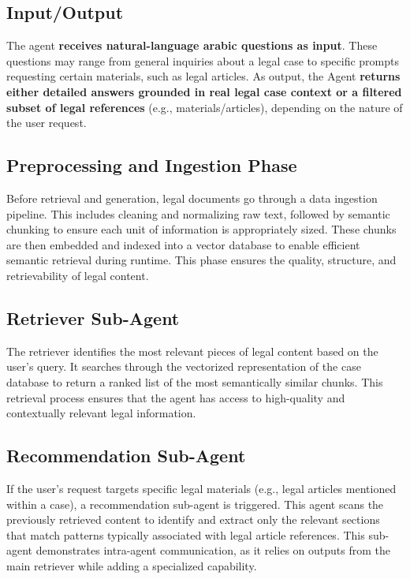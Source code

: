 \subsection{Input/Output}

The agent \textbf{receives natural-language arabic questions as input}. These questions may range from general inquiries about a legal case to specific prompts requesting certain materials, such as legal articles. As output, the Agent\textbf{ returns either detailed answers grounded in real legal case context or a filtered subset of legal references} (e.g., materials/articles), depending on the nature of the user request.

\subsection{Preprocessing and Ingestion Phase}
Before retrieval and generation, legal documents go through a data ingestion pipeline. This includes cleaning and normalizing raw text, followed by semantic chunking to ensure each unit of information is appropriately sized. These chunks are then embedded and indexed into a vector database to enable efficient semantic retrieval during runtime. This phase ensures the quality, structure, and retrievability of legal content.

\subsection{Retriever Sub-Agent }
The retriever identifies the most relevant pieces of legal content based on the user’s query. It searches through the vectorized representation of the case database to return a ranked list of the most semantically similar chunks. This retrieval process ensures that the agent has access to high-quality and contextually relevant legal information.

\subsection{Recommendation Sub-Agent}
If the user's request targets specific legal materials (e.g., legal articles mentioned within a case), a recommendation sub-agent is triggered. This agent scans the previously retrieved content to identify and extract only the relevant sections that match patterns typically associated with legal article references. This sub-agent demonstrates intra-agent communication, as it relies on outputs from the main retriever while adding a specialized capability.
